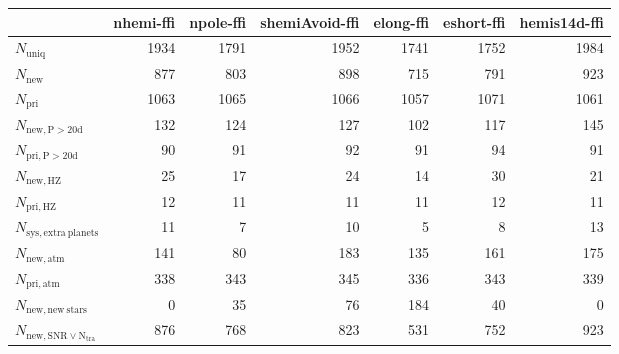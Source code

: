 \begin{tabular}{lrrrrrr}
\toprule
{} &  nhemi-ffi &  npole-ffi &  shemiAvoid-ffi &  elong-ffi &  eshort-ffi &  hemis14d-ffi \\
\midrule
$N_{\mathrm{uniq}}$                &       1934 &       1791 &            1952 &       1741 &        1752 &          1984 \\
$N_{\mathrm{new}}$                 &        877 &        803 &             898 &        715 &         791 &           923 \\
$N_{\mathrm{pri}}$                 &       1063 &       1065 &            1066 &       1057 &        1071 &          1061 \\
$N_{\mathrm{new,P>20d}}$           &        132 &        124 &             127 &        102 &         117 &           145 \\
$N_{\mathrm{pri,P>20d}}$           &         90 &         91 &              92 &         91 &          94 &            91 \\
$N_{\mathrm{new,HZ}}$              &         25 &         17 &              24 &         14 &          30 &            21 \\
$N_{\mathrm{pri,HZ}}$              &         12 &         11 &              11 &         11 &          12 &            11 \\
$N_{\mathrm{sys,extra\ planets}}$  &         11 &          7 &              10 &          5 &           8 &            13 \\
$N_{\mathrm{new,atm}}$             &        141 &         80 &             183 &        135 &         161 &           175 \\
$N_{\mathrm{pri,atm}}$             &        338 &        343 &             345 &        336 &         343 &           339 \\
$N_{\mathrm{new,new\ stars}}$      &          0 &         35 &              76 &        184 &          40 &             0 \\
$N_{\mathrm{new,SNR\lor N_{tra}}}$ &        876 &        768 &             823 &        531 &         752 &           923 \\
\bottomrule
\end{tabular}
